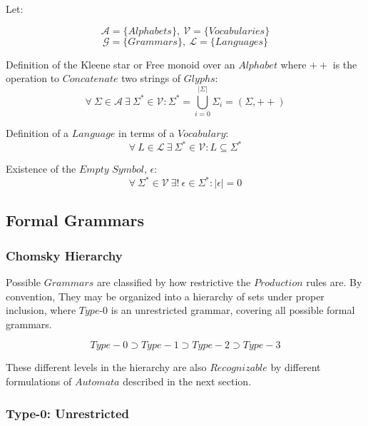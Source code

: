 \documentclass{article}
\begin{document}
Let:

\[
    \mathcal{A} = \{ Alphabets \},\: \mathcal{V} = \{ Vocabularies \}
\] \[
    \mathcal{G} = \{ Grammars \},\: \mathcal{L} = \{ Languages \}
\]

    \begin{description}

    \item Definition of the Kleene star or Free monoid over an
      $Alphabet$ where $++$ is the operation to $Concatenate$ two
      strings of $Glyphs$:
    \[
        \forall \: \Sigma \in \mathcal{A} \:
        \exists \: \Sigma^* \in \mathcal{V}
        : \Sigma^* = \bigcup_{i=0}^{|\Sigma|} \Sigma_i
        = (\Sigma,++)
    \]

    \item Definition of a $Language$ in terms of a $Vocabulary$:
    \[
        \forall \: L \in \mathcal{L} \:
        \exists \: \Sigma^* \in \mathcal{V}
        : L \subseteq \Sigma^*
    \]

    \item Existence of the $Empty$ $Symbol$, $\epsilon$:
    \[
        \forall \: \Sigma^* \in \mathcal{V} \:
        \exists ! \: \epsilon \in \Sigma^*
        : |\epsilon|=0
    \]

    \end{description}

\subsection{Formal Grammars}

\subsubsection{Chomsky Hierarchy}

Possible $Grammars$ are classified by how restrictive the $Production$
rules are. By convention, They may be organized into a hierarchy of
sets under proper inclusion, where $Type$-$0$ is an unrestricted
grammar, covering all possible formal grammars.

\[
    Type-0 \supset Type-1 \supset Type-2 \supset Type-3
\]

These different levels in the hierarchy are also $Recognizable$ by
different formulations of $Automata$ described in the next section.

\subsubsection{Type-0: Unrestricted}
\end{document}
